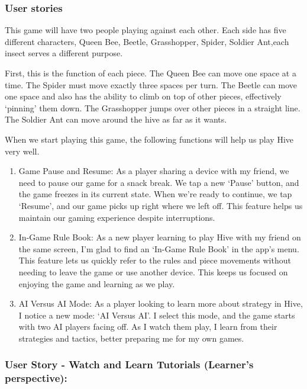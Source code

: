 \documentclass[
]{article}
\begin{document}
\hypertarget{user-stories}{%
\subsubsection{User stories}\label{user-stories}}

This game will have two people playing against each other. Each side has
five different characters, Queen Bee, Beetle, Grasshopper, Spider,
Soldier Ant,each insect serves a different purpose.

First, this is the function of each piece. The Queen Bee can move one
space at a time. The Spider must move exactly three spaces per turn. The
Beetle can move one space and also has the ability to climb on top of
other pieces, effectively `pinning' them down. The Grasshopper jumps
over other pieces in a straight line. The Soldier Ant can move around
the hive as far as it wants.

When we start playing this game, the following functions will help us
play Hive very well.

\begin{enumerate}
\def\labelenumi{\arabic{enumi}.}
\item
  Game Pause and Resume: As a player sharing a device with my friend, we
  need to pause our game for a snack break. We tap a new `Pause' button,
  and the game freezes in its current state. When we're ready to
  continue, we tap `Resume', and our game picks up right where we left
  off. This feature helps us maintain our gaming experience despite
  interruptions.
\item
  In-Game Rule Book: As a new player learning to play Hive with my
  friend on the same screen, I'm glad to find an `In-Game Rule Book' in
  the app's menu. This feature lets us quickly refer to the rules and
  piece movements without needing to leave the game or use another
  device. This keeps us focused on enjoying the game and learning as we
  play.
\item
  AI Versus AI Mode: As a player looking to learn more about strategy in
  Hive, I notice a new mode: `AI Versus AI'. I select this mode, and the
  game starts with two AI players facing off. As I watch them play, I
  learn from their strategies and tactics, better preparing me for my
  own games.
\end{enumerate}

\hypertarget{user-story---watch-and-learn-tutorials-learners-perspective}{%
\subsubsection{User Story - Watch and Learn Tutorials (Learner's
perspective):}\label{user-story---watch-and-learn-tutorials-learners-perspective}}
\end{document}
